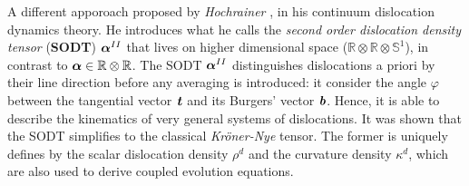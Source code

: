 \documentclass{article}
\begin{document}
A different apporoach proposed by \emph{Hochrainer} \parencite{hochrainerthreedimensionalcontinuum2007} \parencite{hochrainerContinuumdislocation2014}, in his continuum dislocation dynamics theory. He introduces what he calls the \emph{second order dislocation density tensor} (\textbf{SODT}) $\bm{\mathit{\alpha}}^{II}$ that lives on higher dimensional space ($\mathbb{R} \otimes \mathbb{R} \otimes \mathbb{S}^1$), in contrast to $\bm{\mathit{\alpha}} \in \mathbb{R} \otimes \mathbb{R}$. The SODT $\bm{\mathit{\alpha}}^{II}$  distinguishes dislocations a priori by their line direction before any averaging is introduced: it consider the angle $\varphi$ between the tangential vector $\bm{\mathit{t}}$ and its Burgers' vector $\bm{\mathit{b}}$. Hence, it is able to describe the kinematics of very general systems of dislocations. It was shown that the SODT simplifies to the classical \emph{Kröner-Nye} tensor. The former is uniquely defines by the scalar dislocation density $\rho^d$ and the curvature density $\kappa^d$, which are also used to derive coupled evolution equations.
\end{document}
